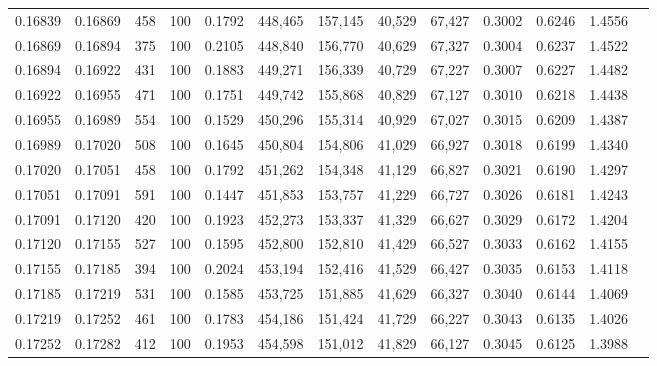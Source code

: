 \begin{tabular}{rrrrrrrrrrrrr}
0.16839 & 0.16869 &   458 & 100 &                                     0.1792 & 448,465 & 157,145 &  40,529 &  67,427 & 0.3002 & 0.6246 & 1.4556 \\
0.16869 & 0.16894 &   375 & 100 &                                     0.2105 & 448,840 & 156,770 &  40,629 &  67,327 & 0.3004 & 0.6237 & 1.4522 \\
0.16894 & 0.16922 &   431 & 100 &                                     0.1883 & 449,271 & 156,339 &  40,729 &  67,227 & 0.3007 & 0.6227 & 1.4482 \\
0.16922 & 0.16955 &   471 & 100 &                                     0.1751 & 449,742 & 155,868 &  40,829 &  67,127 & 0.3010 & 0.6218 & 1.4438 \\
0.16955 & 0.16989 &   554 & 100 &                                     0.1529 & 450,296 & 155,314 &  40,929 &  67,027 & 0.3015 & 0.6209 & 1.4387 \\
0.16989 & 0.17020 &   508 & 100 &                                     0.1645 & 450,804 & 154,806 &  41,029 &  66,927 & 0.3018 & 0.6199 & 1.4340 \\
0.17020 & 0.17051 &   458 & 100 &                                     0.1792 & 451,262 & 154,348 &  41,129 &  66,827 & 0.3021 & 0.6190 & 1.4297 \\
0.17051 & 0.17091 &   591 & 100 &                                     0.1447 & 451,853 & 153,757 &  41,229 &  66,727 & 0.3026 & 0.6181 & 1.4243 \\
0.17091 & 0.17120 &   420 & 100 &                                     0.1923 & 452,273 & 153,337 &  41,329 &  66,627 & 0.3029 & 0.6172 & 1.4204 \\
0.17120 & 0.17155 &   527 & 100 &                                     0.1595 & 452,800 & 152,810 &  41,429 &  66,527 & 0.3033 & 0.6162 & 1.4155 \\
0.17155 & 0.17185 &   394 & 100 &                                     0.2024 & 453,194 & 152,416 &  41,529 &  66,427 & 0.3035 & 0.6153 & 1.4118 \\
0.17185 & 0.17219 &   531 & 100 &                                     0.1585 & 453,725 & 151,885 &  41,629 &  66,327 & 0.3040 & 0.6144 & 1.4069 \\
0.17219 & 0.17252 &   461 & 100 &                                     0.1783 & 454,186 & 151,424 &  41,729 &  66,227 & 0.3043 & 0.6135 & 1.4026 \\
0.17252 & 0.17282 &   412 & 100 &                                     0.1953 & 454,598 & 151,012 &  41,829 &  66,127 & 0.3045 & 0.6125 & 1.3988 \\

\end{tabular}
